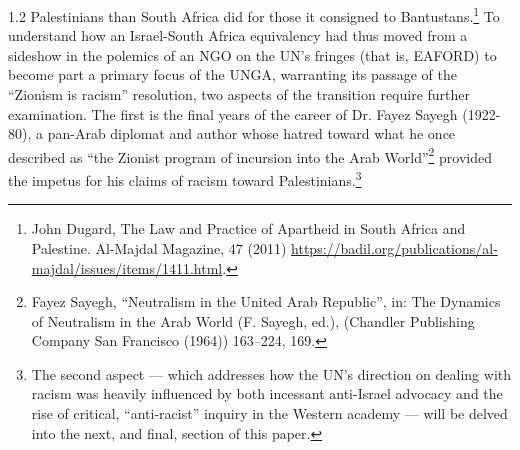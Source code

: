 \documentclass[../unravbook.tex]{subfiles}
\begin{document}
\begin{spacing}{1.2}
Palestinians than South Africa did for those it consigned to Bantustans.\footnote{John Dugard, The Law and Practice of Apartheid in South Africa and Palestine. Al-Majdal Magazine, 47 (2011)
\url{https://badil.org/publications/al-majdal/issues/items/1411.html}.}  To understand how an Israel-South Africa equivalency had thus moved from a sideshow in the polemics of an NGO on the UN's fringes (that is, EAFORD) to become part a primary focus of the UNGA, warranting its passage of the \enquote{Zionism is racism} resolution,  two aspects of the transition require further examination. The first is the final years of the career of Dr. Fayez Sayegh (1922-80), a pan-Arab diplomat and author whose hatred toward what he once described as \enquote{the Zionist program of incursion into the Arab World}\footnote{Fayez Sayegh, \enquote{Neutralism in the United Arab Republic}, in: The Dynamics of Neutralism in the Arab World (F. Sayegh, ed.), (Chandler Publishing Company San Francisco (1964)) 163--224, 169.} provided the impetus for his claims of racism toward Palestinians.\footnote{The second aspect --- which addresses how the UN's direction on dealing with racism was heavily influenced by both incessant anti-Israel advocacy and the rise of critical, \enquote{anti-racist} inquiry in the Western academy --- will be delved into the next, and final, section of this paper.} 


\end{spacing}
\end{document}
